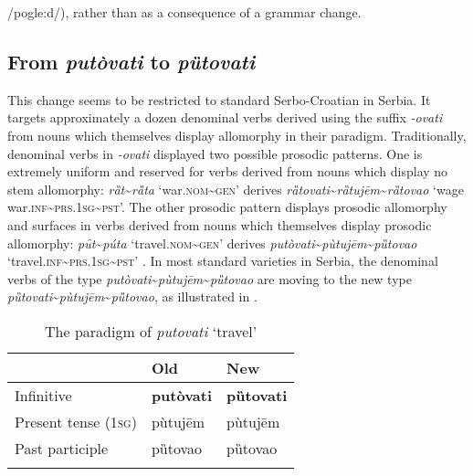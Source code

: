 \documentclass[output=paper,modfonts,nonflat
]{langsci/langscibook}
\begin{document}
/pogle:d/), rather than as a consequence of a grammar change.

\subsection{From \textit{putòvati} to \textit{pȕtovati}} \label{sec:kager:subsec25}
\sloppy This change seems to be restricted to standard Serbo-Croatian in Serbia. It targets approximately a dozen denominal verbs derived using the suffix \textit{-ovati} from nouns which themselves display allomorphy in their paradigm. Traditionally, denominal verbs in \textit{-ovati} displayed two possible prosodic patterns. One is extremely uniform and reserved for verbs derived from nouns which display no stem allomorphy: \textit{rȁt}\textasciitilde{}\textit{rȁta} `war.\textsc{nom}\textasciitilde{}\textsc{gen}' derives \textit{rȁtovati}\textasciitilde{}\textit{rȁtujēm}\textasciitilde{}\textit{rȁtovao} `wage war.\textsc{inf}\textasciitilde{}\textsc{prs.1}\textsc{sg}\textasciitilde{}\textsc{pst}'. The other prosodic pattern displays prosodic allomorphy and surfaces in verbs derived from nouns which themselves display prosodic allomorphy: \textit{pȗt}\textasciitilde{}\textit{púta} `travel.\textsc{nom}\textasciitilde{}\textsc{gen}' derives \textit{putòvati}\textasciitilde{}\textit{pùtujēm}\textasciitilde{}\textit{pȕtovao} `travel.\textsc{inf}\textasciitilde{}\textsc{prs.1}\textsc{sg}\textasciitilde{}\textsc{pst}' \citep[for a detailed analysis see][]{Simonovic2015}. 
In most standard varieties in Serbia, the denominal verbs of the type \textit{putòvati}\textasciitilde{}\textit{pùtujēm}\textasciitilde{}\textit{pȕtovao} are moving to the new type \textit{pȕtovati}\textasciitilde{}\textit{pùtujēm}\textasciitilde{}\textit{pȕtovao}, as illustrated in . 

\begin{table}
\caption{ The paradigm of \textit{putovati} `travel'}
\label{tab:kager:6}
 \begin{tabular}{  l l l }
  \lsptoprule
& Old & New\\ 
 \midrule
Infinitive  &  \textbf{putòvati}  &   \textbf{pȕtovati}\\
Present tense (1\textsc{sg})  &  pùtujēm & pùtujēm\\
Past participle  &  pȕtovao & pȕtovao \\
 \lspbottomrule
 \end{tabular}
\end{table}
\end{document}
